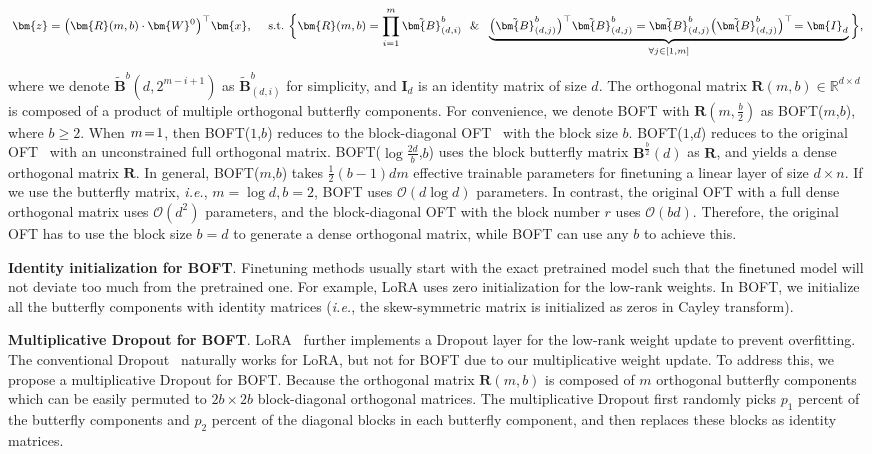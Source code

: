 \begin{equation}
    \footnotesize
    \begin{aligned}\nonumber
    \bm{z}=\big(\bm{R}(m,b)\cdot\bm{W}^0\big)^\top\bm{x},~~~~\text{s.t.}~\bigg{\{}\bm{R}(m,b)=\prod_{i=1}^m \tilde{\bm{B}}^b_{(d,i)}~~\&~~\underbrace{\big(\tilde{\bm{B}}^b_{(d,j)}\big)^\top\tilde{\bm{B}}^b_{(d,j)}=\tilde{\bm{B}}^b_{(d,j)}\big(\tilde{\bm{B}}^b_{(d,j)}\big)^\top\!=\bm{I}_d}_{\forall j\in [1, m]}\bigg{\}},
    \end{aligned}
\end{equation}

where we denote $\tilde{\bm{B}}^b(d,2^{m - i+1})$ as $\tilde{\bm{B}}^b_{(d,i)}$ for simplicity, and $\bm{I}_d$ is an identity matrix of size $d$. The orthogonal matrix $\bm{R}(m,b)\in\mathbb{R}^{d\times d}$ is composed of a product of multiple orthogonal butterfly components. For convenience, we denote BOFT with $\bm{R}(m,\frac{b}{2})$ as BOFT($m$,$b$), where $b\geq 2$. When $\thickmuskip=2mu \medmuskip=2mu m=1$, then BOFT($1$,$b$) reduces to the block-diagonal OFT~\cite{qiu2023controlling} with the block size $b$. BOFT($1$,$d$) reduces to the original OFT~\cite{qiu2023controlling} with an unconstrained full orthogonal matrix. BOFT($\log \frac{2d}{b}$,$b$) uses the block butterfly matrix $\bm{B}^{\frac{b}{2}}(d)$ as $\bm{R}$, and yields a dense orthogonal matrix $\bm{R}$. In general, BOFT($m$,$b$) takes $\frac{1}{2}(b-1)dm$ effective trainable parameters for finetuning a linear layer of size $d\times n$. If we use the butterfly matrix, \emph{i.e.}, $m=\log d,b=2$, BOFT uses $\mathcal{O}(d\log d)$ parameters. In contrast, the original OFT with a full dense orthogonal matrix uses $\mathcal{O}(d^2)$ parameters, and the block-diagonal OFT with the block number $r$ uses $\mathcal{O}(bd)$. Therefore, the original OFT has to use the block size $b=d$ to generate a dense orthogonal matrix, while BOFT can use any $b$ to achieve this.

\textbf{Identity initialization for BOFT}. Finetuning methods usually start with the exact pretrained model such that the finetuned model will not deviate too much from the pretrained one. For example, LoRA uses zero initialization for the low-rank weights. In BOFT, we initialize all the butterfly components with identity matrices (\emph{i.e.}, the skew-symmetric matrix is initialized as zeros in Cayley transform).

\textbf{Multiplicative Dropout for BOFT}. LoRA~\cite{hulora2022} further implements a Dropout layer for the low-rank weight update to prevent overfitting. The conventional Dropout~\cite{srivastava2014dropout} naturally works for LoRA, but not for BOFT due to our multiplicative weight update. To address this, we propose a multiplicative Dropout for BOFT. Because the orthogonal matrix $\bm{R}(m,b)$ is composed of $m$ orthogonal butterfly components which can be easily permuted to $2b\times 2b$ block-diagonal orthogonal matrices. The multiplicative Dropout first randomly picks $p_1$ percent of the butterfly components and $p_2$ percent of the diagonal blocks in each butterfly component, and then replaces these blocks as identity matrices.


